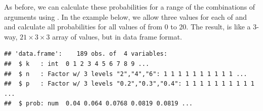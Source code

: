 \documentclass[11pt]{book}
\renewenvironment{knitrout}{\small\renewcommand{\baselinestretch}{.85}}{} %
\begin{document}
As before, we can calculate these probabilities for a range
of the combinations of arguments using .
In the example below,
we allow three values for each of  and 
and calculate all probabilities for all values of 
from 0 to 20. The result,  is like a 3-way,
$21 \times 3 \times 3$
array of  values, but in data frame format.
\begin{knitrout}
\color{fgcolor}\begin{kframe}
\begin{alltt}
 \hlkwb{<-}\hlstd{(}\hlstd{=}\hlopt{:}\hlstd{,} \hlstd{=}\hlstd{(}\hlstd{,} \hlstd{,} \hlstd{),} \hlstd{=}\hlstd{(}\hlstd{,} \hlstd{,} \hlstd{))}
 \hlkwb{<-}  \hlstd{=}\hlstd{(XN[,}\hlstd{], XN[,}\hlstd{], XN[,}\hlstd{]))}
\hlopt{$} \hlkwb{=} \hlopt{$}
\hlopt{$} \hlkwb{=} \hlopt{$}
\end{alltt}
\begin{verbatim}
## 'data.frame':	189 obs. of  4 variables:
##  $ k   : int  0 1 2 3 4 5 6 7 8 9 ...
##  $ n   : Factor w/ 3 levels "2","4","6": 1 1 1 1 1 1 1 1 1 1 ...
##  $ p   : Factor w/ 3 levels "0.2","0.3","0.4": 1 1 1 1 1 1 1 1 1 1 ...
##  $ prob: num  0.04 0.064 0.0768 0.0819 0.0819 ...
\end{verbatim}
\end{kframe}
\end{knitrout}
\end{document}
